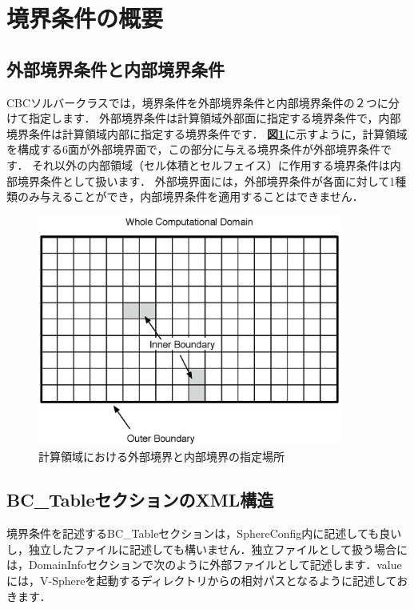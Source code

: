 \graphicspath{{./fig_BC/}}

%
\section{境界条件の概要}

%
\hypertarget{tgt:BC policy}{\subsection{外部境界条件と内部境界条件}}
CBCソルバークラスでは，境界条件を外部境界条件と内部境界条件の２つに分けて指定します．
外部境界条件は計算領域外部面に指定する境界条件で，内部境界条件は計算領域内部に指定する境界条件です．
\textbf{図\ref{fig:BCs}}に示すように，計算領域を構成する6面が外部境界面で，この部分に与える境界条件が外部境界条件です．
それ以外の内部領域（セル体積とセルフェイス）に作用する境界条件は内部境界条件として扱います．
外部境界面には，外部境界条件が各面に対して1種類のみ与えることができ，内部境界条件を適用することはできません．

\begin{figure}[htbp]
\begin{center}
\includegraphics[width=10cm,clip]{Boundary.eps}
\end{center}
\caption{計算領域における外部境界と内部境界の指定場所}
\label{fig:BCs}
\end{figure}

%
\subsection{BC\_TableセクションのXML構造}
境界条件を記述するBC\_Tableセクションは，SphereConfig内に記述しても良いし，独立したファイルに記述しても構いません．独立ファイルとして扱う場合には，DomainInfoセクションで次のように外部ファイルとして記述します．valueには，V-Sphereを起動するディレクトリからの相対パスとなるように記述しておきます．

